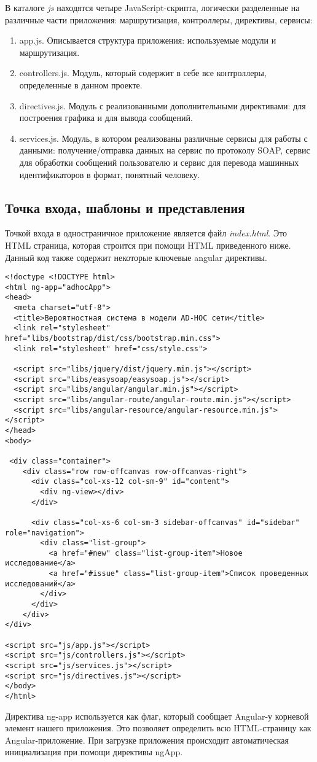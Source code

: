 В каталоге \textit{js} находятся четыре JavaScript-скрипта, логически разделенные на различные части приложения: маршрутизация, контроллеры, директивы, сервисы:
\begin{enumerate}
 \item app.js. Описывается структура приложения: используемые модули и маршрутизация.
 \item controllers.js. Модуль, который содержит в себе все контроллеры, определенные в данном проекте.
 \item directives.js. Модуль с реализованными дополнительными директивами: для построения графика и для вывода сообщений.
 \item services.js. Модуль, в котором реализованы различные сервисы для работы с данными: получение/отправка данных на сервис по протоколу SOAP, сервис для обработки сообщений пользователю и сервис для перевода машинных идентификаторов в формат, понятный человеку.
\end{enumerate}

\subsection{Точка входа, шаблоны и представления}

Точкой входа в одностраничное приложение является файл \textit{index.html}. Это HTML страница, которая строится при помощи HTML приведенного ниже. Данный код также содержит некоторые ключевые angular директивы.
\begin{lstlisting}[basicstyle=\footnotesize]
<!doctype <!DOCTYPE html>
<html ng-app="adhocApp">
<head>
  <meta charset="utf-8">
  <title>Вероятностная система в модели AD-HOC сети</title>
  <link rel="stylesheet" href="libs/bootstrap/dist/css/bootstrap.min.css">
  <link rel="stylesheet" href="css/style.css">

  <script src="libs/jquery/dist/jquery.min.js"></script>
  <script src="libs/easysoap/easysoap.js"></script>
  <script src="libs/angular/angular.min.js"></script>
  <script src="libs/angular-route/angular-route.min.js"></script>
  <script src="libs/angular-resource/angular-resource.min.js"></script>
</head>
<body>

 <div class="container">
    <div class="row row-offcanvas row-offcanvas-right">
      <div class="col-xs-12 col-sm-9" id="content">
        <div ng-view></div>
      </div>

      <div class="col-xs-6 col-sm-3 sidebar-offcanvas" id="sidebar" role="navigation">
        <div class="list-group">
          <a href="#new" class="list-group-item">Новое исследование</a>
          <a href="#issue" class="list-group-item">Список проведенных исследований</a>
        </div>
      </div>
    </div>
</div>

<script src="js/app.js"></script>
<script src="js/controllers.js"></script>
<script src="js/services.js"></script>
<script src="js/directives.js"></script>
</body>
</html> 
\end{lstlisting}
Директива ng-app используется как флаг, который сообщает Angular-у корневой элемент нашего приложения. Это позволяет определить всю HTML-страницу как Angular-приложение. При загрузке приложения происходит автоматическая инициализация при помощи директивы ngApp.

